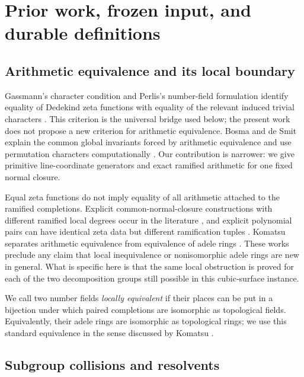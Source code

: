 \section{Prior work, frozen input, and durable definitions}
\label{sec:prior-definitions}

\subsection{Arithmetic equivalence and its local boundary}

Gassmann's character condition and Perlis's number-field formulation identify
equality of Dedekind zeta functions with equality of the relevant induced
trivial characters \citep[Theorem~1]{perlis1977equation}.  This criterion is
the universal bridge used below; the present work does not propose a new
criterion for arithmetic equivalence.  Bosma and de Smit explain the common
global invariants forced by arithmetic equivalence and use permutation
characters computationally \citep[printed pp.~67--68]{bosmadesmit2002small}.
Our contribution is narrower: we give primitive line-coordinate generators
and exact ramified arithmetic for one fixed normal closure.

Equal zeta functions do not imply equality of all arithmetic attached to the
ramified completions.  Explicit common-normal-closure constructions with
different ramified local degrees occur in the literature
\citep[proof of Theorem~1.2]{mcreynolds2015spectra}, and explicit polynomial
pairs can have identical zeta data but different ramification tuples
\citep[Theorems~1.3 and~3.7]{mantillasoler2019question}.  Komatsu separates
arithmetic equivalence from equivalence of adele rings
\citep{komatsu1984adele}.  These works preclude any claim that local
inequivalence or nonisomorphic adele rings are new in general.  What is
specific here is that the same local obstruction is proved for each of the
two decomposition groups still possible in this cubic-surface instance.

We call two number fields \emph{locally equivalent} if their places can be
put in a bijection under which paired completions are isomorphic as
topological fields.  Equivalently, their adele rings are isomorphic as
topological rings; we use this standard equivalence in the sense discussed by
Komatsu \citep{komatsu1984adele}.

\subsection{Subgroup collisions and resolvents}

